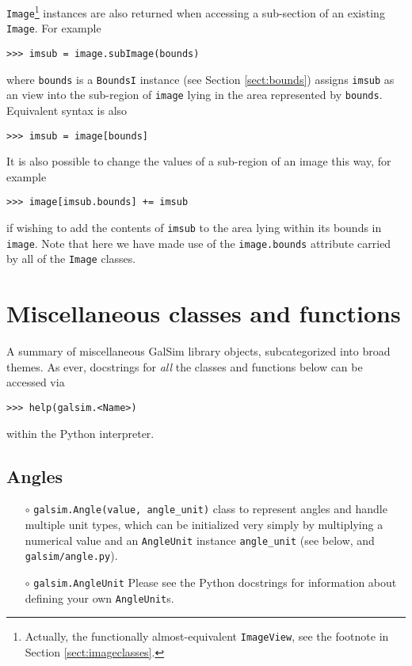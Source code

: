 \documentclass[preprint,11pt]{aastex}
\begin{document}
\texttt{Image}\footnote{Actually, the functionally almost-equivalent
  \texttt{ImageView}, see the footnote in Section
  \ref{sect:imageclasses}.}  instances are also returned when
accessing a sub-section of an existing \texttt{Image}.  For example

{\tt >>> imsub = image.subImage(bounds)}

where \texttt{bounds} is a \texttt{BoundsI} instance (see Section
\ref{sect:bounds}) assigns \texttt{imsub} as an view into
the sub-region of \texttt{image} lying in the area represented by
\texttt{bounds}.  Equivalent syntax is also

{\tt >>> imsub = image[bounds]}

It is also possible to change the values of a sub-region of an image
this way, for example

{\tt >>> image[imsub.bounds] += imsub}

if wishing to add the contents of \texttt{imsub} to the area lying
within its bounds in \texttt{image}.  Note that here we have made use of
the \texttt{image.bounds} attribute carried by all of the \texttt{Image}
classes.

\section{Miscellaneous classes and functions}\label{sect:misc}

A summary of miscellaneous GalSim library objects, subcategorized into
broad themes.  As ever, docstrings for \emph{all} the classes and
functions below can be accessed via

{\tt >>> help(galsim.<Name>)}

within the Python interpreter.

\subsection{Angles}\label{sect:angles}
\begin{itemize}

\item[$\circ$] \texttt{galsim.Angle(value, angle\_unit)} \newline
  {class to represent angles and handle multiple unit types,
    which can be initialized very simply by multiplying a numerical
    value and an \texttt{AngleUnit} instance \texttt{angle\_unit} (see
    below, and \texttt{galsim/angle.py}).}

\item[$\circ$] \texttt{galsim.AngleUnit} 
 Please see the Python docstrings for information about defining your
 own \texttt{AngleUnit}s.
\end{itemize}
\end{document}
